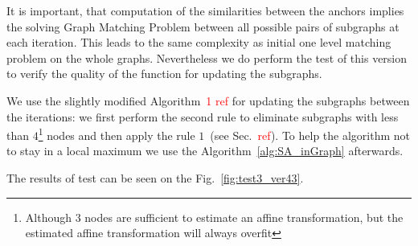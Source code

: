 \documentclass[
	fontsize=12pt,
	paper=a4,
	twoside=false,
	numbers=noenddot,
	plainheadsepline,
	toc=listof,
	toc=bibliography
]{scrartcl}
\newcommand\ToDo[1]{\textcolor{red}{#1}}
\begin{document}
It is important, that computation of the similarities between the anchors implies the solving Graph Matching Problem between all possible pairs of subgraphs at each iteration. This leads to the same complexity as initial one level matching problem on the whole graphs. Nevertheless we do perform the test of this version to verify the quality of the function for updating the subgraphs.

We use the slightly modified Algorithm~\ToDo{1 ref} for updating the subgraphs between the iterations: we first perform the second rule to eliminate subgraphs with less than $4$\footnote{Although $3$ nodes are sufficient to estimate an affine transformation, but the estimated affine transformation will always overfit} nodes and then apply the rule $1$~(see Sec.~\ToDo{ref}). To help the algorithm not to stay in a local maximum we use the Algorithm~\ref{alg:SA_inGraph} afterwards.

The results of test can be seen on the Fig.~\ref{fig:test3_ver43}.

%
\end{document}
